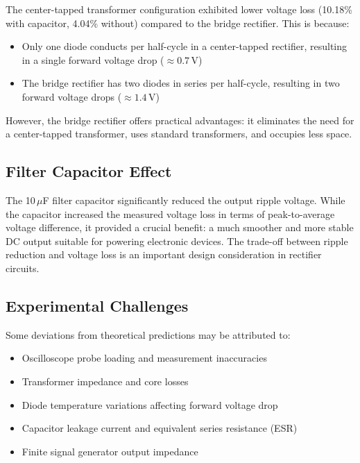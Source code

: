The center-tapped transformer configuration exhibited lower voltage loss (10.18\% with capacitor, 4.04\% without) compared to the bridge rectifier. This is because:
\begin{itemize}
  \item Only one diode conducts per half-cycle in a center-tapped rectifier, resulting in a single forward voltage drop ($\approx 0.7\,\text{V}$)
  \item The bridge rectifier has two diodes in series per half-cycle, resulting in two forward voltage drops ($\approx 1.4\,\text{V}$)
\end{itemize}

However, the bridge rectifier offers practical advantages: it eliminates the need for a center-tapped transformer, uses standard transformers, and occupies less space.

\subsection{Filter Capacitor Effect}

The 10\,$\mu$F filter capacitor significantly reduced the output ripple voltage. While the capacitor increased the measured voltage loss in terms of peak-to-average voltage difference, it provided a crucial benefit: a much smoother and more stable DC output suitable for powering electronic devices. The trade-off between ripple reduction and voltage loss is an important design consideration in rectifier circuits.

\subsection{Experimental Challenges}

Some deviations from theoretical predictions may be attributed to:
\begin{itemize}
  \item Oscilloscope probe loading and measurement inaccuracies
  \item Transformer impedance and core losses
  \item Diode temperature variations affecting forward voltage drop
  \item Capacitor leakage current and equivalent series resistance (ESR)
  \item Finite signal generator output impedance
\end{itemize}
